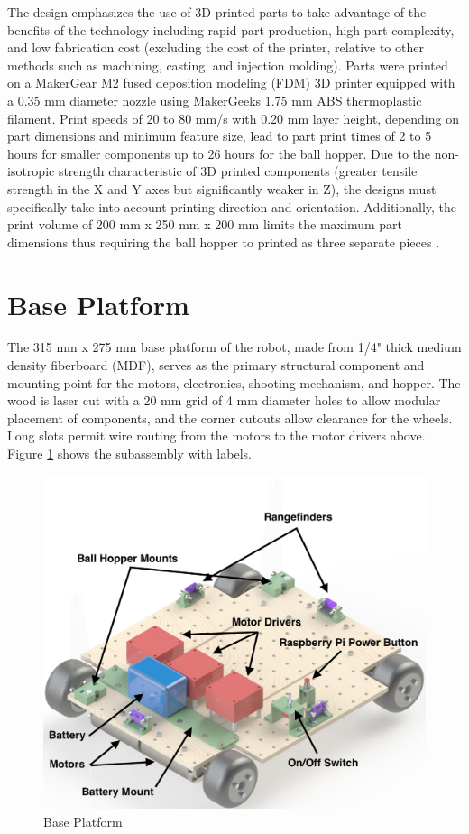 The design emphasizes the use of 3D printed parts to take advantage of the benefits of the technology including rapid part production, high part complexity, and low fabrication cost (excluding the cost of the printer, relative to other methods such as machining, casting, and injection molding). Parts were printed on a MakerGear M2 fused deposition modeling (FDM) 3D printer equipped with a 0.35 mm diameter nozzle using MakerGeeks 1.75 mm ABS thermoplastic filament. Print speeds of 20 to 80 mm/s with 0.20 mm layer height, depending on part dimensions and minimum feature size, lead to part print times of 2 to 5 hours for smaller components up to 26 hours for the ball hopper. Due to the non-isotropic strength characteristic of 3D printed components (greater tensile strength in the X and Y axes but significantly weaker in Z), the designs must specifically take into account printing direction and orientation. Additionally, the print volume of 200 mm x 250 mm x 200 mm limits the maximum part dimensions thus requiring the ball hopper to printed as three separate pieces \cite{makergear_m2}. 

\section{Base Platform}
The 315 mm x 275 mm base platform of the robot, made from 1/4" thick medium density fiberboard (MDF), serves as the primary structural component and mounting point for the motors, electronics, shooting mechanism, and hopper. The wood is laser cut with a 20 mm grid of 4 mm diameter holes to allow modular placement of components, and the corner cutouts allow clearance for the wheels. Long slots permit wire routing from the motors to the motor drivers above. Figure \ref{fig:base_platform} shows the subassembly with labels.

\begin{figure}[H]   %
	\centering \includegraphics[width=6in, height=3.85in, keepaspectratio]{figures/base_platform.png}
	\caption{Base Platform}	\label{fig:base_platform}
\end{figure}


